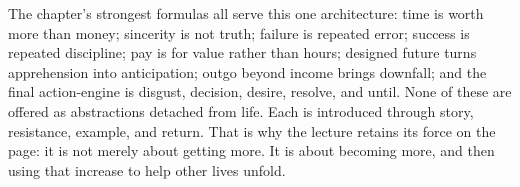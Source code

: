 The chapter's strongest formulas all serve this one architecture: time is worth more than money; sincerity is not truth; failure is repeated error; success is repeated discipline; pay is for value rather than hours; designed future turns apprehension into anticipation; outgo beyond income brings downfall; and the final action-engine is disgust, decision, desire, resolve, and until. None of these are offered as abstractions detached from life. Each is introduced through story, resistance, example, and return. That is why the lecture retains its force on the page: it is not merely about getting more. It is about becoming more, and then using that increase to help other lives unfold.